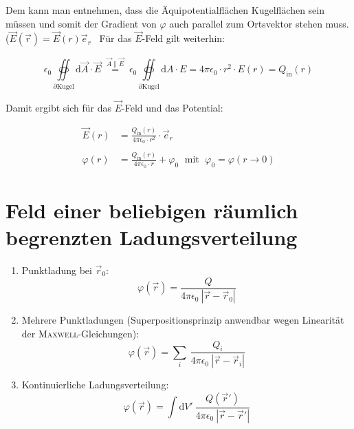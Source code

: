 Dem kann man entnehmen, dass die Äquipotentialflächen Kugelflächen sein müssen und somit der Gradient von $\varphi$ auch parallel zum Ortsvektor stehen muss.($\vec{E}(\vec{r}) = \vec{E}(r)\vec{e}_r$ \
Für das $\vec{E}$-Feld gilt weiterhin:

\begin{equation*}
\epsilon_0\oiint\limits_{\partial \text{Kugel}}\mathrm{d}\vec{A}\cdot\vec{E} \; \overset{\vec{A}\parallel\vec{E}}{=} \; \epsilon_0\oiint\limits_{\partial \text{Kugel}}\mathrm{d} A \cdot E = 4\pi\epsilon_0\cdot r^2 \cdot E(r) = Q_{\mathrm{in}}(r)
\end{equation*}

Damit ergibt sich für das $\vec{E}$-Feld und das Potential:

\begin{align*}
\vec{E}(r) &= \frac{Q_{\mathrm{in}}(r)}{4\pi\epsilon_0\cdot r^2} \cdot \vec{e}_r\\
\ \\
\varphi(r) &= \frac{Q_{\mathrm{in}}(r)}{4\pi\epsilon_0\cdot r} + \varphi_0 \; \text{ mit } \; \varphi_0 = \varphi(r \rightarrow 0)
\end{align*}

\section{Feld einer beliebigen räumlich begrenzten Ladungsverteilung}

\begin{enumerate}
	\item Punktladung bei $\vec{r}_0$:
	\begin{equation*}
	\varphi(\vec{r}) = \frac{Q}{4\pi\epsilon_0 \ |\vec{r}-\vec{r}_0|}
	\end{equation*}
	
	
	\item Mehrere Punktladungen (Superpositionsprinzip anwendbar wegen Linearität der \textsc{Maxwell}-Gleichungen):
	\begin{equation*}
	\varphi(\vec{r}) = \sum\limits_i \ \frac{Q_i}{4\pi\epsilon_0 \ |\vec{r}-\vec{r}_i|}
	\end{equation*}
	
	\item Kontinuierliche Ladungsverteilung:
	\begin{equation*}
	\varphi(\vec{r}) = \int\mathrm{d}V' \ \frac{Q(\vec{r}')}{4\pi\epsilon_0 \ |\vec{r}-\vec{r}'|}
	\end{equation*}
\end{enumerate}

